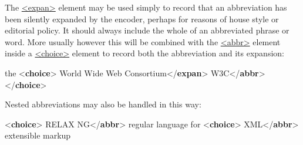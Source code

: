 The \hyperref[TEI.expan]{<expan>} element may be used simply to record that an abbreviation has been silently expanded by the encoder, perhaps for reasons of house style or editorial policy. It should always include the whole of an abbreviated phrase or word. More usually however this will be combined with the \hyperref[TEI.abbr]{<abbr>} element inside a \hyperref[TEI.choice]{<choice>} element to record both the abbreviation and its expansion: \par\bgroup{}\exampleFont \begin{shaded}\noindent\mbox{} the\mbox{}\newline 
{<\textbf{choice}>}\mbox{}\newline 
{}World Wide Web Consortium{</\textbf{expan}>}\mbox{}\newline 
{}W3C{</\textbf{abbr}>}\mbox{}\newline 
{</\textbf{choice}>}\end{shaded}\egroup\par \noindent  Nested abbreviations may also be handled in this way: \par\bgroup{}\exampleFont \begin{shaded}\noindent\mbox{}{<\textbf{choice}>}\mbox{}\newline 
{}RELAX NG{</\textbf{abbr}>}\mbox{}\newline 
{}regular\mbox{}\newline 
\hspace*{1em}\hspace*{1em} language for {<\textbf{choice}>}\mbox{}\newline 
\hspace*{1em}\hspace*{1em}XML{</\textbf{abbr}>}\mbox{}\newline 
\hspace*{1em}\hspace*{1em}extensible markup\mbox{}\newline 

\end{shaded}

